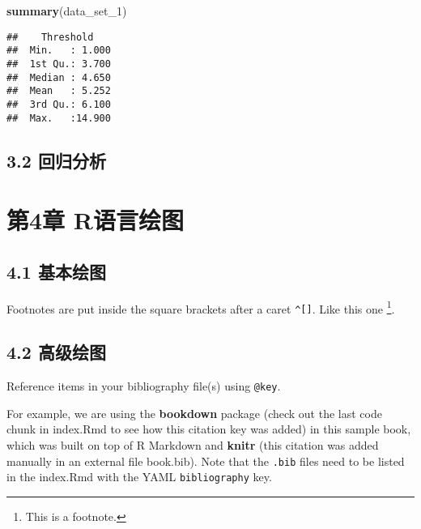 \documentclass[
]{book}
\newenvironment{Shaded}{\begin{snugshade}}{\end{snugshade}}
\newcommand{\FunctionTok}[1]{\textcolor[rgb]{0.13,0.29,0.53}{\textbf{#1}}}
\newcommand{\NormalTok}[1]{#1}
\theoremstyle{definition}
\theoremstyle{definition}
\theoremstyle{definition}
\theoremstyle{definition}
\theoremstyle{remark}
\begin{document}
\begin{Shaded}
\begin{Highlighting}[]
\FunctionTok{summary}\NormalTok{(data\_set\_1)}
\end{Highlighting}
\end{Shaded}

\begin{verbatim}
##    Threshold     
##  Min.   : 1.000  
##  1st Qu.: 3.700  
##  Median : 4.650  
##  Mean   : 5.252  
##  3rd Qu.: 6.100  
##  Max.   :14.900
\end{verbatim}

\hypertarget{ux56deux5f52ux5206ux6790}{%
\section*{3.2 回归分析}\label{ux56deux5f52ux5206ux6790}}

\hypertarget{ux7b2c4ux7ae0-rux8bedux8a00ux7ed8ux56fe}{%
\chapter*{第4章 R语言绘图}\label{ux7b2c4ux7ae0-rux8bedux8a00ux7ed8ux56fe}}

\hypertarget{ux57faux672cux7ed8ux56fe}{%
\section*{4.1 基本绘图}\label{ux57faux672cux7ed8ux56fe}}

Footnotes are put inside the square brackets after a caret \texttt{\^{}{[}{]}}. Like this one \footnote{This is a footnote.}.

\hypertarget{ux9ad8ux7ea7ux7ed8ux56fe}{%
\section*{4.2 高级绘图}\label{ux9ad8ux7ea7ux7ed8ux56fe}}

Reference items in your bibliography file(s) using \texttt{@key}.

For example, we are using the \textbf{bookdown} package \citep{R-bookdown} (check out the last code chunk in index.Rmd to see how this citation key was added) in this sample book, which was built on top of R Markdown and \textbf{knitr} \citep{xie2015} (this citation was added manually in an external file book.bib).
Note that the \texttt{.bib} files need to be listed in the index.Rmd with the YAML \texttt{bibliography} key.
\end{document}
